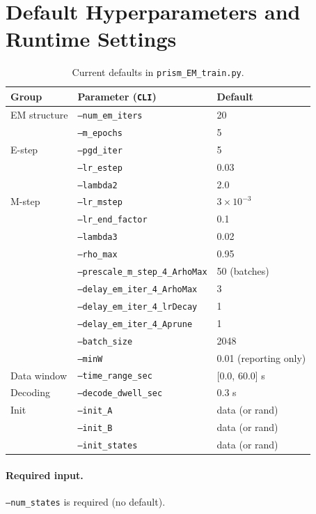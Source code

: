 \documentclass[11pt]{article}
\begin{document}
\section{Default Hyperparameters and Runtime Settings}
\label{sec:defaults}

\begin{table}[h]
\centering
\begin{tabular}{lll}
\toprule
Group & Parameter (\texttt{CLI}) & Default \\
\midrule
EM structure & \texttt{--num\_em\_iters} & 20 \\
 & \texttt{--m\_epochs} & 5 \\
E-step & \texttt{--pgd\_iter} & 5 \\
 & \texttt{--lr\_estep} & 0.03 \\
 & \texttt{--lambda2} & 2.0 \\
M-step & \texttt{--lr\_mstep} & \(3 \times 10^{-3}\) \\
 & \texttt{--lr\_end\_factor} & 0.1 \\
 & \texttt{--lambda3} & 0.02 \\
 & \texttt{--rho\_max} & 0.95 \\
 & \texttt{--prescale\_m\_step\_4\_ArhoMax} & 50 (batches) \\
 & \texttt{--delay\_em\_iter\_4\_ArhoMax} & 3 \\
 & \texttt{--delay\_em\_iter\_4\_lrDecay} & 1 \\
 & \texttt{--delay\_em\_iter\_4\_Aprune} & 1 \\
 & \texttt{--batch\_size} & 2048 \\
 & \texttt{--minW} & 0.01 (reporting only)\\
Data window & \texttt{--time\_range\_sec} & [0.0, 60.0] s \\
Decoding & \texttt{--decode\_dwell\_sec} & 0.3 s \\
Init & \texttt{--init\_A} & data (or rand)\\
 & \texttt{--init\_B} & data (or rand) \\
 & \texttt{--init\_states} & data (or rand) \\
\bottomrule
\end{tabular}
\caption{Current defaults in \texttt{prism\_EM\_train.py}.}
\end{table}

\paragraph{Required input.}
\texttt{--num\_states} is required (no default).
\end{document}
